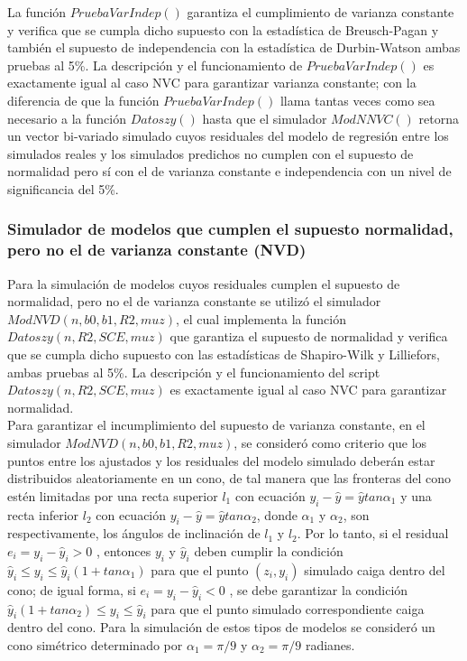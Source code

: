 La función $PruebaVarIndep()$ garantiza el cumplimiento de varianza constante y verifica que se cumpla dicho supuesto con la estadística de Breusch-Pagan y también el supuesto de independencia con la estadística de Durbin-Watson ambas pruebas al 5\%. La descripción y el funcionamiento de $PruebaVarIndep()$ es exactamente igual al caso NVC para garantizar varianza constante; con la diferencia de que la función $PruebaVarIndep()$ llama tantas veces como sea necesario a la función $Datoszy()$ hasta que el simulador $ModNNVC()$  retorna un vector bi-variado simulado cuyos residuales del modelo de regresión entre los simulados reales y los simulados predichos no cumplen con el supuesto de normalidad pero sí con el de varianza constante e independencia con un nivel de significancia del 5\%.\\ 

\subsubsection{Simulador de modelos que cumplen el supuesto normalidad, pero no el de varianza constante (NVD)}

Para la simulación de modelos cuyos residuales cumplen el supuesto de normalidad, pero no el de varianza constante se utilizó el simulador $ModNVD(n,b0,b1,R2,muz)$, el cual implementa la función $Datoszy(n,R2,SCE,muz)$ que garantiza el supuesto de normalidad y verifica que se cumpla dicho supuesto con las estadísticas de Shapiro-Wilk y Lilliefors, ambas pruebas al 5\%. La descripción y el funcionamiento del script $Datoszy(n,R2,SCE,muz)$ es exactamente igual al caso NVC para garantizar normalidad.\\


Para garantizar el incumplimiento del supuesto de varianza constante, en el simulador $ModNVD(n,b0,b1,R2,muz)$, se consideró como criterio que los puntos entre los ajustados y los residuales del modelo simulado deberán estar distribuidos aleatoriamente en un cono, de tal manera que las fronteras del cono estén limitadas por una recta superior $l_1$ con ecuación $y_i-\hat{y}=\hat{y}tan \alpha_1$ y una recta inferior $l_2$ con ecuación $y_i-\hat{y}=\hat{y}tan \alpha_2$, donde  $\alpha_1$ y $\alpha_2$, son respectivamente, los ángulos de inclinación de $l_1$ y $l_2$. Por lo tanto, si el residual $e_i=y_i - \hat{y}_i > 0$ , entonces $y_i$ y $\hat{y}_i$ deben cumplir la condición $\hat{y}_i \leq y_i \leq \hat{y}_i (1+tan \alpha_1)$ para que el punto $(z_i,y_i)$ simulado caiga dentro del cono; de igual forma, si $e_i=y_i - \hat{y}_i < 0$ , se debe garantizar la condición $\hat{y}_i (1+tan \alpha_2) \leq y_i \leq \hat{y}_i $ para que el punto simulado correspondiente caiga dentro del cono. Para la simulación de estos tipos de modelos se consideró un cono simétrico determinado por $\alpha_1=\pi / 9$ y $\alpha_2=\pi/9$ radianes. \\


